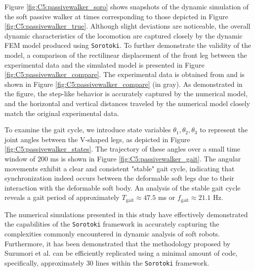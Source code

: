 Figure \ref{fig:C5:passivewalker_soro} shows snapshots of the dynamic simulation of the soft passive walker at times corresponding to those depicted in Figure \ref{fig:C5:passivewalker_true}. Although slight deviations are noticeable, the overall dynamic characteristics of the locomotion are captured closely by the dynamic FEM model produced using \texttt{Sorotoki}. To further demonstrate the validity of the model, a comparison of the rectilinear displacement of the front leg between the experimental data and the simulated model is presented in Figure \ref{fig:C5:passivewalker_compare}. The experimental data is obtained from \cite{Suzumori2008Sep} and is shown in Figure \ref{fig:C5:passivewalker_compare} (in gray). As demonstrated in the figure, the step-like behavior is accurately captured by the numerical model, and the horizontal and vertical distances traveled by the numerical model closely match the original experimental data.

To examine the gait cycle, we introduce state variables $\theta_1, \theta_2, \theta_3$ to represent the joint angles between the V-shaped legs, as depicted in Figure \ref{fig:C5:passivewalker_states}. The trajectory of these angles over a small time window of 200 \si{\milli \second} is shown in Figure \ref{fig:C5:passivewalker_gait}. The angular movements exhibit a clear and consistent "stable" gait cycle, indicating that synchronization indeed occurs between the deformable soft legs due to their interaction with the deformable soft body. An analysis of the stable gait cycle reveals a gait period of approximately $T_{\textrm{gait}} \approx 47.5$ \si{\milli \second} or $f_{\textrm{gait}} \approx 21.1$ \si{\hertz}.

The numerical simulations presented in this study have effectively demonstrated the capabilities of the  \texttt{Sorotoki} framework in accurately capturing the complexities commonly encountered in dynamic analysis of soft robots. Furthermore, it has been demonstrated that the methodology proposed by Suzumori et al. \cite{Suzumori2008Sep} can be efficiently replicated using a minimal amount of code, specifically, approximately 30 lines within the \texttt{Sorotoki} framework.


